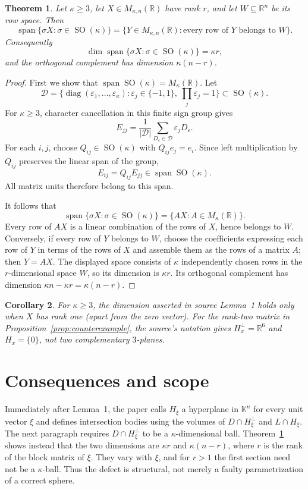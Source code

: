 \documentclass[11pt]{article}
\newtheorem{theorem}{Theorem}
\newtheorem{corollary}[theorem]{Corollary}
\newcommand{\R}{\mathbb R}
\newcommand{\SO}{\operatorname{SO}}
\newcommand{\Span}{\operatorname{span}}
\begin{document}
\begin{theorem}\label{thm:general}
Let $\kappa\geq3$, let $X\in M_{\kappa,n}(\R)$ have rank $r$, and let
$W\subseteq\R^n$ be its row space.  Then
\[
 \Span\{\sigma X:\sigma\in\SO(\kappa)\}
 =\{Y\in M_{\kappa,n}(\R):\text{every row of $Y$ belongs to $W$}\}.
\]
Consequently
\[
 \dim\Span\{\sigma X:\sigma\in\SO(\kappa)\}=\kappa r,
\]
and the orthogonal complement has dimension $\kappa(n-r)$.
\end{theorem}

\begin{proof}
First we show that $\Span\SO(\kappa)=M_\kappa(\R)$.  Let
\[
 \mathcal D=\{\operatorname{diag}(\varepsilon_1,\ldots,\varepsilon_\kappa):
 \varepsilon_j\in\{-1,1\},\ \prod_j\varepsilon_j=1\}\subset\SO(\kappa).
\]
For $\kappa\geq3$, character cancellation in this finite sign group gives
\[
 E_{jj}=\frac1{|\mathcal D|}
 \sum_{D_\varepsilon\in\mathcal D}\varepsilon_jD_\varepsilon.
\]
For each $i,j$, choose $Q_{ij}\in\SO(\kappa)$ with
$Q_{ij}e_j=e_i$.  Since left multiplication by $Q_{ij}$ preserves the
linear span of the group,
\[
 E_{ij}=Q_{ij}E_{jj}\in\Span\SO(\kappa).
\]
All matrix units therefore belong to this span.

It follows that
\[
 \Span\{\sigma X:\sigma\in\SO(\kappa)\}
 =\{AX:A\in M_\kappa(\R)\}.
\]
Every row of $AX$ is a linear combination of the rows of $X$, hence belongs
to $W$.  Conversely, if every row of $Y$ belongs to $W$, choose the
coefficients expressing each row of $Y$ in terms of the rows of $X$ and
assemble them as the rows of a matrix $A$; then $Y=AX$.  The displayed
space consists of $\kappa$ independently chosen rows in the $r$-dimensional
space $W$, so its dimension is $\kappa r$.  Its orthogonal complement has
dimension $\kappa n-\kappa r=\kappa(n-r)$.
\end{proof}

\begin{corollary}
For $\kappa\geq3$, the dimension asserted in source Lemma~1 holds only when
$X$ has rank one (apart from the zero vector).  For the rank-two matrix in
Proposition~\ref{prop:counterexample}, the source's notation gives
$H_x^\perp=\R^6$ and $H_x=\{0\}$, not two complementary $3$-planes.
\end{corollary}

\section{Consequences and scope}

Immediately after Lemma~1, the paper calls $H_\xi$ a hyperplane in
$\mathbb K^n$ for every unit vector $\xi$ and defines intersection bodies
using the volumes of $D\cap H_\xi^\perp$ and $L\cap H_\xi$.  The next
paragraph requires $D\cap H_\xi^\perp$ to be a $\kappa$-dimensional ball.
Theorem~\ref{thm:general} shows instead that the two dimensions are
$\kappa r$ and $\kappa(n-r)$, where $r$ is the rank of the block matrix of
$\xi$.  They vary with $\xi$, and for $r>1$ the first section need not be a
$\kappa$-ball.  Thus the defect is structural, not merely a faulty
parametrization of a correct sphere.
\end{document}
